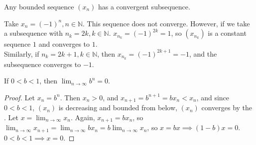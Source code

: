 \documentclass[12pt]{article}
\begin{document}
\begin{theorem}\label{thm:bwthm}\footnotemark
  Any bounded sequence $(x_n)$ has a convergent subsequence.  
  \end{theorem}
\begin{example}
  Take $x_n = (-1)^n, n \in\mathbb{N}$. This sequence does not converge. However, if we take a subsequence with $n_k =2k, k \in\mathbb{N}$. $x_{n_k} = (-1)^{2k} = 1$, so $(x_{n_k})$ is a constant sequence $1$ and converges to $1$.\\ Similarly, if $n_k = 2k+1, k \in \mathbb{N}$, then $x_{n_k} = (-1)^{2k+1} = -1$, and the subsequence converges to $-1$.
\end{example}  

\begin{proposition}\label{prop:prelimfact}
  If $0 < b < 1$, then $\lim_{n\to\infty}b^{n} = 0$.
\end{proposition}
\begin{proof}
  Let $x_n = b^n$. Then $x_n > 0$, and $x_{n+1} = b^{n+1} = b x_{n} < x_n$, and since $ 0 < b < 1$, $(x_n)$ is decreasing and bounded from below, $(x_n)$ converges by the . Let $x = \lim_{n\to\infty}x_n$. Again, $x_{n+1} = b x_n$, so $\lim_{n\to\infty}x_{n+1} = \lim_{n\to\infty}bx_{n} = b\lim_{n\to\infty}x_n$, so $x = bx \implies (1-b)x = 0$. $0 < b < 1 \implies x = 0$.
\end{proof}
\end{document}
